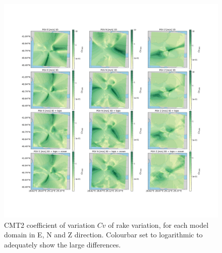 \documentclass[../Text/00main.tex]{subfiles}
\begin{document}
\begin{figure}
    \centering
    \includegraphics[width=1\linewidth,trim = 2cm 5cm 1cm 5cm, clip]{images_results/rake_variation_sigma_sc2.png}
    \caption{CMT2 coefficient of variation $Cv$ of rake variation, for each model domain in E, N and Z direction. Colourbar set to logarithmic to adequately show the large differences.}
    \label{fig:cmt2sigm}
\end{figure}
\end{document}
